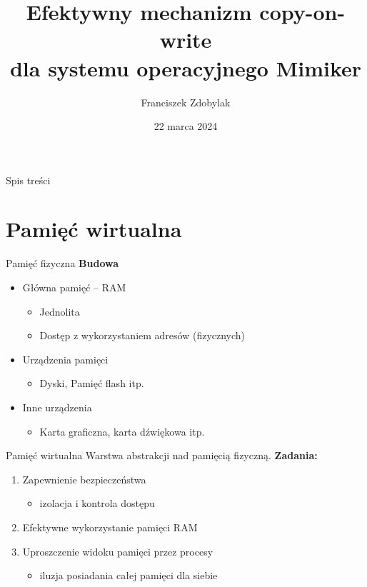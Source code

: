 \documentclass[notes]{beamer}
\title{Efektywny mechanizm copy-on-write\\dla systemu operacyjnego Mimiker}
\author{Franciszek Zdobylak}
\institute{Instytut Informatyki\\Uniwersytet Wrocławski}
\date{22 marca 2024}
\begin{document}
\maketitle

\begin{frame}{Spis treści}
  \vfill
  \tableofcontents
  \vfill
\end{frame}

\section{Pamięć wirtualna}

\begin{frame}{Pamięć fizyczna}
  \vfill
  \textbf{\large Budowa}
  \vfill
  \begin{itemize}
    \item Główna pamięć -- RAM
      \begin{itemize}
        \item Jednolita
        \item Dostęp z wykorzystaniem adresów (fizycznych)
      \end{itemize}
    \vfill
    \item Urządzenia pamięci
      \begin{itemize}
        \item Dyski, Pamięć flash itp.
      \end{itemize}
    \vfill
    \item Inne urządzenia
      \begin{itemize}
        \item Karta graficzna, karta dźwiękowa itp.
      \end{itemize}
  \end{itemize}
  \vfill
\end{frame}

\begin{frame}{Pamięć wirtualna}
  {\large Warstwa abstrakcji nad pamięcią fizyczną.}
  \vfill
  \textbf{Zadania:}
  \vspace{1em}
  \begin{enumerate}
    \item<2-> Zapewnienie bezpieczeństwa
      \begin{itemize}
        \item izolacja i kontrola dostępu
      \end{itemize}
      \vspace{1em}
    \item<3-> Efektywne wykorzystanie pamięci RAM
      \vspace{1em}
    \item<4-> Uproszczenie widoku pamięci przez procesy
      \begin{itemize}
        \item iluzja posiadania całej pamięci dla siebie
      \end{itemize}
  \end{enumerate}
\end{frame}
\end{document}

